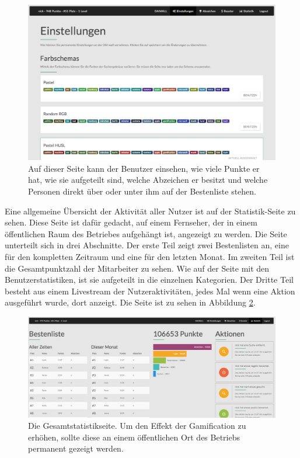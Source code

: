\documentclass[12pt,twoside]{book}
\begin{document}
\begin{figure}[htbp]
    \centering
    \includegraphics[width=1.0\textwidth]{images/infoboard_settings.png}
    \caption{Auf dieser Seite kann der Benutzer einsehen, wie viele Punkte er hat, wie sie aufgeteilt sind, welche Abzeichen er besitzt und welche Personen direkt über oder unter ihm auf der Bestenliste stehen.}
    \label{fig:settings}
\end{figure}

Eine allgemeine Übersicht der Aktivität aller Nutzer ist auf der Statistik-Seite zu sehen. Diese Seite ist dafür gedacht, auf einem Fernseher, der in einem öffentlichen Raum des Betriebes aufgehängt ist, angezeigt zu werden. Die Seite unterteilt sich in drei Abschnitte. Der erste Teil zeigt zwei Bestenlisten an, eine für den kompletten Zeitraum und eine für den letzten Monat. Im zweiten Teil ist die Gesamtpunktzahl der Mitarbeiter zu sehen. Wie auf der Seite mit den Benutzerstatistiken, ist sie aufgeteilt in die einzelnen Kategorien. Der Dritte Teil besteht aus einem Livestream der Nutzeraktivitäten, jedes Mal wenn eine Aktion ausgeführt wurde, dort anzeigt. Die Seite ist zu sehen in Abbildung \ref{fig:stats}.

\begin{figure}[htbp]
    \centering
    \includegraphics[width=1.0\textwidth]{images/infoboard_stats.png}
    \caption{Die Gesamtstatistikseite. Um den Effekt der Gamification zu erhöhen, sollte diese an einem öffentlichen Ort des Betriebs permanent gezeigt werden.}
    \label{fig:stats}
\end{figure}
\end{document}
